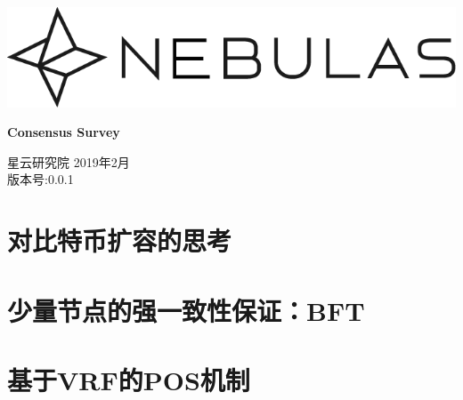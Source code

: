 \documentclass[12pt]{article}
\begin{document}
\pagestyle{empty}
\renewcommand{\contentsname}{目录}
\renewcommand{\abstractname}{摘要}
\renewcommand{\refname}{参考文献}
\renewcommand{\figurename}{图}
\renewcommand{\tablename}{表}
\renewcommand{\baselinestretch}{1.5}
\renewcommand{\appendixname}{附录}
\renewcommand{\proofname}{证明}

\pagecolor{\pcolor}

\begin{titlepage}
  \begin{center}
    \vspace*{5.5cm}
    \includegraphics[scale=0.5]{../common/Nebulas.png}
    \vspace{0.5cm}


    \textbf{\huge{Consensus Survey}}

    \vspace{0.5cm}
    星云研究院
    \vfill
    2019年2月 \\
    版本号:0.0.1
    \textbf{}
  \end{center}

\end{titlepage}
\setcounter{page}{0}
\tableofcontents
\newpage
\setcounter{page}{1}
\pagestyle{fancy}                                 
\vspace*{0.01cm}


\part{对比特币扩容的思考}


\part{少量节点的强一致性保证：BFT}



\part{基于VRF的POS机制}

%
%
%
%
%
%
\newpage


\newpage
%
%
\end{document}

